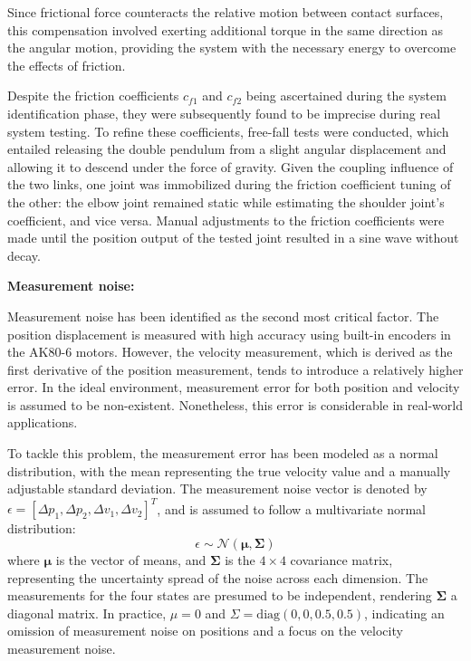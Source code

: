 Since frictional force counteracts the relative motion between contact surfaces, this compensation involved exerting additional torque in the same direction as the angular motion, providing the system with the necessary energy to overcome the effects of friction.

Despite the friction coefficients \(c_{f1}\) and \(c_{f2}\) being ascertained during the system identification phase, they were subsequently found to be imprecise during real system testing. To refine these coefficients, free-fall tests were conducted, which entailed releasing the double pendulum from a slight angular displacement and allowing it to descend under the force of gravity. Given the coupling influence of the two links, one joint was immobilized during the friction coefficient tuning of the other: the elbow joint remained static while estimating the shoulder joint's coefficient, and vice versa. Manual adjustments to the friction coefficients were made until the position output of the tested joint resulted in a sine wave without decay.

\textbf{Measurement noise:}

Measurement noise has been identified as the second most critical factor. The position displacement is measured with high accuracy using built-in encoders in the AK80-6 motors. However, the velocity measurement, which is derived as the first derivative of the position measurement, tends to introduce a relatively higher error. In the ideal environment, measurement error for both position and velocity is assumed to be non-existent. Nonetheless, this error is considerable in real-world applications.

To tackle this problem, the measurement error has been modeled as a normal distribution, with the mean representing the true velocity value and a manually adjustable standard deviation. The measurement noise vector is denoted by \(\epsilon = [\Delta p_1, \Delta p_2, \Delta v_1, \Delta v_2]^T\), and is assumed to follow a multivariate normal distribution:
\begin{equation}
\epsilon \sim \mathcal{N}(\boldsymbol{\mu}, \boldsymbol{\Sigma})
\end{equation}
where \(\boldsymbol{\mu}\) is the vector of means, and \(\boldsymbol{\Sigma}\) is the \(4 \times 4\) covariance matrix, representing the uncertainty spread of the noise across each dimension. The measurements for the four states are presumed to be independent, rendering \(\boldsymbol{\Sigma}\) a diagonal matrix. In practice, \(\mu = 0\) and \(\Sigma = \text{diag}(0,0,0.5,0.5)\), indicating an omission of measurement noise on positions and a focus on the velocity measurement noise.

